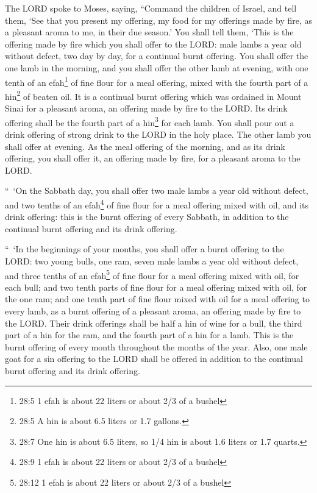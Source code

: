 \mychapter{} \myverse*{}The LORD spoke to Moses, saying,
\myverse{}“Command the children of Israel, and tell them, ‘See that you present my offering,
my food for my offerings made by fire, as a pleasant aroma to me, in their due season.’
\myverse{}You shall tell them, ‘This is the offering made by fire which you shall offer
to the LORD: male lambs a year old without defect, two day by day, for a continual burnt offering.
\myverse{}You shall offer the one lamb in the morning, and you shall offer the other
lamb at evening,
\myverse{}with one tenth of an efah\footnote{ 28:5 1 efah is about 22 liters or about 2/3 of a bushel} of fine flour for a meal offering,
mixed with the fourth part of a hin\footnote{ 28:5 A hin is about 6.5 liters or 1.7 gallons.} of beaten oil.
\myverse{}It is a continual burnt offering which was ordained in Mount Sinai for a pleasant
aroma, an offering made by fire to the LORD.
\myverse{}Its drink offering shall be the fourth part of a hin\footnote{ 28:7 One hin is about 6.5 liters, so 1/4 hin is about 1.6 liters or 1.7 quarts.} for each
lamb. You shall pour out a drink offering of strong drink to the LORD in the holy place.
\myverse{}The other lamb you shall offer at evening. As the meal offering of the morning,
and as its drink offering, you shall offer it, an offering made by fire, for a pleasant aroma to the LORD.


\myverse{}“ ‘On the Sabbath day, you shall offer two male lambs a year old
without defect, and two tenths of an efah\footnote{ 28:9 1 efah is about 22 liters or about 2/3 of a bushel} of fine flour for a meal offering
mixed with oil, and its drink offering:
\myverse{}this is the burnt offering of every Sabbath, in addition to the continual
burnt offering and its drink offering.


\myverse{}“ ‘In the beginnings of your months, you shall offer a burnt
offering to the LORD: two young bulls, one ram, seven male lambs a year old without defect,
\myverse{}and three tenths of an efah\footnote{ 28:12 1 efah is about 22 liters or about 2/3 of a bushel} of fine flour for a meal offering
mixed with oil, for each bull; and two tenth parts of fine flour for a meal offering mixed with oil, for
the one ram;
\myverse{}and one tenth part of fine flour mixed with oil for a meal offering to every
lamb, as a burnt offering of a pleasant aroma, an offering made by fire to the LORD.
\myverse{}Their drink offerings shall be half a hin of wine for a bull, the third part
of a hin for the ram, and the fourth part of a hin for a lamb. This is the burnt offering of every month
throughout the months of the year.
\myverse{}Also, one male goat for a sin offering to the LORD shall be offered in addition
to the continual burnt offering and its drink offering.



